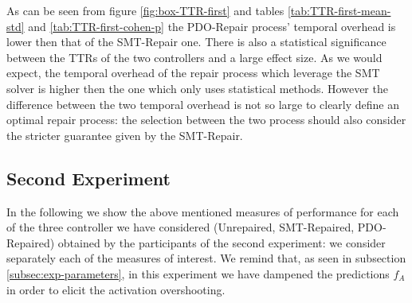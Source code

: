 As can be seen from figure \ref{fig:box-TTR-first} and tables \ref{tab:TTR-first-mean-std} and \ref{tab:TTR-first-cohen-p} the PDO-Repair process' temporal overhead is lower then that of the SMT-Repair one. There is also a statistical significance between the TTRs of the two controllers and a large effect size. As we would expect, the temporal overhead of the repair process which leverage the SMT solver is higher then the one which only uses statistical methods. However the difference between the two temporal overhead is not so large to clearly define an optimal repair process: the selection between the two process should also consider the stricter guarantee given by the SMT-Repair.
%
%
%
%
%
\subsection{Second Experiment}\label{subsec:second-exp}
In the following we show the above mentioned measures of performance for each of the three controller we have considered (Unrepaired, SMT-Repaired, PDO-Repaired) obtained by the participants of the second experiment: we consider separately each of the measures of interest. We remind that, as seen in subsection \ref{subsec:exp-parameters}, in this experiment we have dampened the predictions $f_{A}$ in order to elicit the activation overshooting.
%
%
%
%
%
